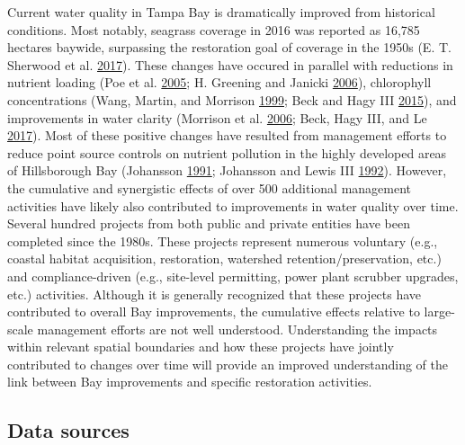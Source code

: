 \documentclass[]{article}
\begin{document}
Current water quality in Tampa Bay is dramatically improved from
historical conditions. Most notably, seagrass coverage in 2016 was
reported as 16,785 hectares baywide, surpassing the restoration goal of
coverage in the 1950s (E. T. Sherwood et al.
\protect\hyperlink{ref-Sherwood17}{2017}). These changes have occured in
parallel with reductions in nutrient loading (Poe et al.
\protect\hyperlink{ref-Poe05}{2005}; H. Greening and Janicki
\protect\hyperlink{ref-Greening06}{2006}), chlorophyll concentrations
(Wang, Martin, and Morrison \protect\hyperlink{ref-Wang99}{1999}; Beck
and Hagy III \protect\hyperlink{ref-Beck15}{2015}), and improvements in
water clarity (Morrison et al. \protect\hyperlink{ref-Morrison06}{2006};
Beck, Hagy III, and Le \protect\hyperlink{ref-Beck17c}{2017}). Most of
these positive changes have resulted from management efforts to reduce
point source controls on nutrient pollution in the highly developed
areas of Hillsborough Bay (Johansson
\protect\hyperlink{ref-Johansson91}{1991}; Johansson and Lewis III
\protect\hyperlink{ref-Johansson92}{1992}). However, the cumulative and
synergistic effects of over 500 additional management activities have
likely also contributed to improvements in water quality over time.
Several hundred projects from both public and private entities have been
completed since the 1980s. These projects represent numerous voluntary
(e.g., coastal habitat acquisition, restoration, watershed
retention/preservation, etc.) and compliance-driven (e.g., site-level
permitting, power plant scrubber upgrades, etc.) activities. Although it
is generally recognized that these projects have contributed to overall
Bay improvements, the cumulative effects relative to large-scale
management efforts are not well understood. Understanding the impacts
within relevant spatial boundaries and how these projects have jointly
contributed to changes over time will provide an improved understanding
of the link between Bay improvements and specific restoration
activities.

\subsection{Data sources}\label{data-sources}
\end{document}
